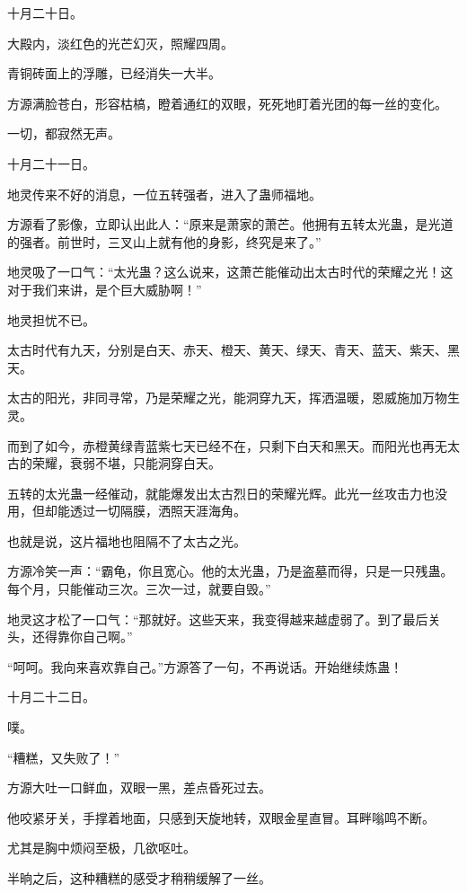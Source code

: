 
\begin{this_body}

十月二十日。

大殿内，淡红色的光芒幻灭，照耀四周。

青铜砖面上的浮雕，已经消失一大半。

方源满脸苍白，形容枯槁，瞪着通红的双眼，死死地盯着光团的每一丝的变化。

一切，都寂然无声。

十月二十一日。

地灵传来不好的消息，一位五转强者，进入了蛊师福地。

方源看了影像，立即认出此人：“原来是萧家的萧芒。他拥有五转太光蛊，是光道的强者。前世时，三叉山上就有他的身影，终究是来了。”

地灵吸了一口气：“太光蛊？这么说来，这萧芒能催动出太古时代的荣耀之光！这对于我们来讲，是个巨大威胁啊！”

地灵担忧不已。

太古时代有九天，分别是白天、赤天、橙天、黄天、绿天、青天、蓝天、紫天、黑天。

太古的阳光，非同寻常，乃是荣耀之光，能洞穿九天，挥洒温暖，恩威施加万物生灵。

而到了如今，赤橙黄绿青蓝紫七天已经不在，只剩下白天和黑天。而阳光也再无太古的荣耀，衰弱不堪，只能洞穿白天。

五转的太光蛊一经催动，就能爆发出太古烈日的荣耀光辉。此光一丝攻击力也没用，但却能透过一切隔膜，洒照天涯海角。

也就是说，这片福地也阻隔不了太古之光。

方源冷笑一声：“霸龟，你且宽心。他的太光蛊，乃是盗墓而得，只是一只残蛊。每个月，只能催动三次。三次一过，就要自毁。”

地灵这才松了一口气：“那就好。这些天来，我变得越来越虚弱了。到了最后关头，还得靠你自己啊。”

“呵呵。我向来喜欢靠自己。”方源答了一句，不再说话。开始继续炼蛊！

十月二十二日。

噗。

“糟糕，又失败了！”

方源大吐一口鲜血，双眼一黑，差点昏死过去。

他咬紧牙关，手撑着地面，只感到天旋地转，双眼金星直冒。耳畔嗡鸣不断。

尤其是胸中烦闷至极，几欲呕吐。

半晌之后，这种糟糕的感受才稍稍缓解了一丝。


\end{this_body}
